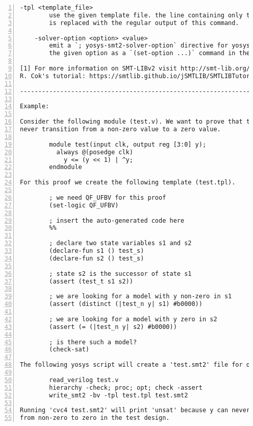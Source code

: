 \begin{lstlisting}[numbers=left,frame=single]
    -tpl <template_file>
        use the given template file. the line containing only the token '%%'
        is replaced with the regular output of this command.

    -solver-option <option> <value>
        emit a `; yosys-smt2-solver-option` directive for yosys-smtbmc to write
        the given option as a `(set-option ...)` command in the SMT-LIBv2.

[1] For more information on SMT-LIBv2 visit http://smt-lib.org/ or read David
R. Cok's tutorial: https://smtlib.github.io/jSMTLIB/SMTLIBTutorial.pdf

---------------------------------------------------------------------------

Example:

Consider the following module (test.v). We want to prove that the output can
never transition from a non-zero value to a zero value.

        module test(input clk, output reg [3:0] y);
          always @(posedge clk)
            y <= (y << 1) | ^y;
        endmodule

For this proof we create the following template (test.tpl).

        ; we need QF_UFBV for this proof
        (set-logic QF_UFBV)

        ; insert the auto-generated code here
        %%

        ; declare two state variables s1 and s2
        (declare-fun s1 () test_s)
        (declare-fun s2 () test_s)

        ; state s2 is the successor of state s1
        (assert (test_t s1 s2))

        ; we are looking for a model with y non-zero in s1
        (assert (distinct (|test_n y| s1) #b0000))

        ; we are looking for a model with y zero in s2
        (assert (= (|test_n y| s2) #b0000))

        ; is there such a model?
        (check-sat)

The following yosys script will create a 'test.smt2' file for our proof:

        read_verilog test.v
        hierarchy -check; proc; opt; check -assert
        write_smt2 -bv -tpl test.tpl test.smt2

Running 'cvc4 test.smt2' will print 'unsat' because y can never transition
from non-zero to zero in the test design.
\end{lstlisting}

